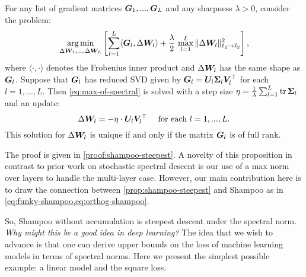 \begin{myproposition}\label{prop:shampoo-steepest} 
    For any list of gradient matrices ${\bm{G}}_1,...,{\bm{G}}_L$ and any sharpness $\lambda > 0$, consider the problem:
    \begin{equation}\label{eq:max-of-spectral}
        \operatorname*{arg\,min}_{\Delta {\bm{W}}_1,...,\Delta {\bm{W}}_L} \left[ \sum_{l=1}^L \langle{\bm{G}}_l, \Delta {\bm{W}}_l\rangle + \frac{\lambda}{2} \, \max_{l=1}^L \Vert {\Delta{\bm{W}}_l} \Vert_{\ell_2\to\ell_2}^2 \right],
    \end{equation}
    where $\langle\cdot, \cdot\rangle$ denotes the Frobenius inner product and $\Delta {\bm{W}}_l$ has the same shape as ${\bm{G}}_l$. Suppose that ${\bm{G}}_l$ has reduced SVD given by ${\bm{G}}_l = {\bm{U}}_l {\bm{\Sigma}}_l {\bm{V}}_l^\top$ for each $l=1,...,L$. Then \cref{eq:max-of-spectral} is solved with a step size $\eta = \frac{1}{\lambda}\sum_{l=1}^L \operatorname{tr} {\bm{\Sigma}}_l$ and an update:
    \begin{equation}\label{eq:shampoo-layerwise}
        \Delta {\bm{W}}_l = -\eta \cdot {\bm{U}}_l {\bm{V}}_l^\top \quad \text{ for each } l=1,...,L.
    \end{equation}
    This solution for $\Delta {\bm{W}}_l$ is unique if and only if the matrix ${\bm{G}}_l$ is of full rank.
\end{myproposition}
The proof is given in \cref{proof:shampoo-steepest}. A novelty of this proposition in contrast to prior work on stochastic spectral descent \citep{spectral-descent-2, spectral-descent-1} is our use of a max norm over layers to handle the multi-layer case. However, our main contribution here is to draw the connection between \cref{prop:shampoo-steepest} and Shampoo as in \cref{eq:funky-shampoo,eq:orthog-shampoo}.

So, Shampoo without accumulation is steepest descent under the spectral norm. \textit{Why might this be a good idea in deep learning?} The idea that we wish to advance is that one can derive upper bounds on the loss of machine learning models in terms of spectral norms. Here we present the simplest possible example: a linear model and the square loss.

